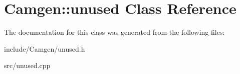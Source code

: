 \hypertarget{a00575}{}\section{Camgen\+:\+:unused Class Reference}
\label{a00575}


The documentation for this class was generated from the following files\+:\begin{DoxyCompactItemize}
\item 
include/\+Camgen/unused.\+h\item 
src/unused.\+cpp\end{DoxyCompactItemize}
